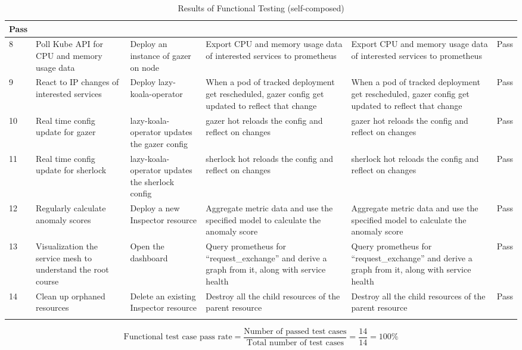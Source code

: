 \begin{longtable}{|p{3mm}|p{30mm}|p{27mm}|p{33mm}|p{33mm}|p{10mm}|}
      Pass \\ \hline
    8 &
      Poll Kube API for CPU and memory usage data &
      Deploy an instance of \ac{gazer} on node &
      Export CPU and memory usage data of interested services to prometheus &
      Export CPU and memory usage data of interested services to prometheus &
      Pass \\ \hline
    9 &
      React to IP changes of interested services &
      Deploy \ac{lazy-koala-operator} &
      When a pod of tracked deployment get rescheduled, gazer config get updated to reflect that change &
      When a pod of tracked deployment get rescheduled, gazer config get updated to reflect that change &
      Pass \\ \hline
    10 &
      Real time config update for \ac{gazer} &
      \ac{lazy-koala-operator} updates the \ac{gazer} config &
      \ac{gazer} hot reloads the config and reflect on changes &
      \ac{gazer} hot reloads the config and reflect on changes &
      Pass \\ \hline
    11 &
      Real time config update for \ac{sherlock} &
      \ac{lazy-koala-operator} updates the \ac{sherlock} config &
      \ac{sherlock} hot reloads the config and reflect on changes &
      \ac{sherlock} hot reloads the config and reflect on changes &
      Pass \\ \hline
    12 &
      Regularly calculate anomaly scores &
      Deploy a new Inspector resource &
      Aggregate metric data and use the specified model to calculate the anomaly score &
      Aggregate metric data and use the specified model to calculate the anomaly score &
      Pass \\ \hline
    13 &
      Visualization the service mesh to understand the root course &
      Open the dashboard &
      Query prometheus for “request\_exchange” and derive a graph from it, along with service health &
      Query prometheus for “request\_exchange” and derive a graph from it, along with service health &
      Pass \\ \hline
    14 &
      Clean up orphaned resources &
      Delete an existing Inspector resource &
      Destroy all the child resources of the parent resource &
      Destroy all the child resources of the parent resource &
      Pass \\ \hline

      \caption{Results of Functional Testing (self-composed)}
\end{longtable}

\begingroup
\setlength{\abovedisplayskip}{-0.5cm}
\[
\text{Functional test case pass rate} = \frac{\text{Number of passed test cases}}{\text{Total number of test cases}} = \frac{14}{14} = 100\%
\]
\endgroup